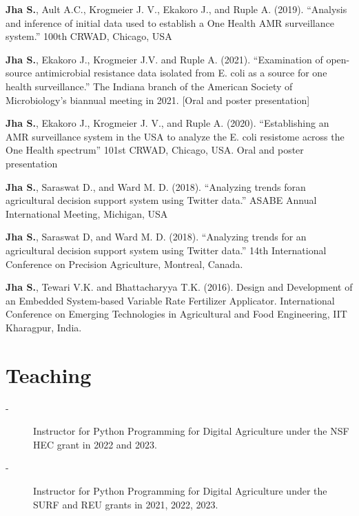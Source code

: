 \documentclass[10pt]{article}
\begin{document}
\begin{enumerate}[label={[\arabic*]}, leftmargin=3em, itemsep=0pt, topsep=0pt]
\item	\textbf{Jha S.}, Ault A.C., Krogmeier J. V., Ekakoro J., and Ruple A. (2019). “Analysis and inference of initial data used to establish a One Health AMR surveillance system.” 100th CRWAD, Chicago, USA
\item	\textbf{Jha S.}, Ekakoro J., Krogmeier J.V. and Ruple A. (2021). “Examination of open-source antimicrobial resistance data isolated from E. coli as a source for one health surveillance.” The Indiana branch of the American Society of Microbiology's biannual meeting in 2021. [Oral and poster presentation]
\item	\textbf{Jha S.}, Ekakoro J., Krogmeier J. V., and Ruple A. (2020). “Establishing an AMR surveillance system in the USA to analyze the E. coli resistome across the One Health spectrum” 101st CRWAD, Chicago, USA. Oral and poster presentation
\item	\textbf{Jha S.}, Saraswat D., and Ward M. D. (2018). “Analyzing trends foran  agricultural decision support system using Twitter data.” ASABE Annual International Meeting, Michigan, USA
\item	\textbf{Jha S.}, Saraswat D, and Ward M. D. (2018). “Analyzing trends for an agricultural decision support system using Twitter data.” 14th International Conference on Precision Agriculture, Montreal, Canada.
\item \textbf{Jha S.}, Tewari V.K. and Bhattacharyya T.K. (2016). Design and Development of an Embedded System-based Variable Rate Fertilizer Applicator. International Conference on Emerging Technologies in Agricultural and Food Engineering, IIT Kharagpur, India.
\end{enumerate}


\section{Teaching}
\begin{description}
    \item[-] Instructor for Python Programming for Digital Agriculture under the NSF HEC grant in 2022 and 2023.
    \item[-] Instructor for Python Programming for Digital Agriculture under the SURF and REU grants in 2021, 2022, 2023.
\end{description}
\end{document}
